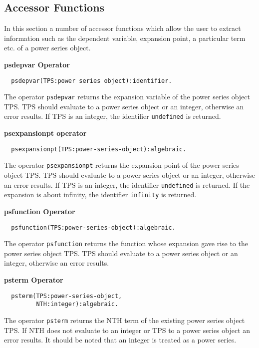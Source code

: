 \subsection{Accessor Functions}
In this section a number of accessor functions which allow the user to extract
information such as the dependent variable, expansion point, a particular term
etc. of a power series object.

\textbf{psdepvar Operator}
\hypertarget{operator:PSDEPVAR}{}
\begin{verbatim}
  psdepvar(TPS:power series object):identifier.
\end{verbatim}
The operator \texttt{psdepvar} returns the expansion variable of the
power series object TPS. TPS should evaluate to a power
series object or an integer, otherwise an error results. If TPS
is an integer, the identifier \texttt{undefined} is returned.

\textbf{psexpansionpt operator}
\hypertarget{operator:PSEXPANSIONPT}{}
\begin{verbatim}
  psexpansionpt(TPS:power-series-object):algebraic.
\end{verbatim}
The operator \texttt{psexpansionpt} returns the expansion point of the
power series object TPS. TPS should evaluate to a power
series object or an integer, otherwise an error results. If TPS
is an integer, the identifier \texttt{undefined} is returned. If the
expansion is about infinity, the identifier \texttt{infinity} is
returned.

\textbf{psfunction Operator}
\hypertarget{operator:PSFUNCTION}{}
\begin{verbatim}
  psfunction(TPS:power-series-object):algebraic.
\end{verbatim}
The operator \texttt{psfunction} returns the function whose expansion
gave rise to the power series object TPS. TPS should
evaluate to a power series object or an integer, otherwise an error
results.

\textbf{psterm Operator}
\hypertarget{operator:PSTERM}{}
\begin{verbatim}
  psterm(TPS:power-series-object, 
         NTH:integer):algebraic.
\end{verbatim}
The operator \texttt{psterm} returns the NTH term of the existing
power series object TPS. If NTH does not evaluate to
an integer or TPS to a power series object an error results.  It
should be noted that an integer is treated as a power series.


